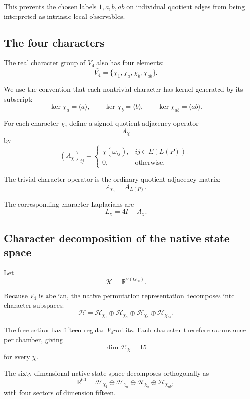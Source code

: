 This prevents the chosen labels \(1,a,b,ab\) on individual quotient
edges from being interpreted as intrinsic local observables.

\subsection{The four characters}

The real character group of \(V_4\) also has four elements:
\[
\widehat{V_4}
=
\{\chi_1,\chi_a,\chi_b,\chi_{ab}\}.
\]

We use the convention that each nontrivial character has kernel
generated by its subscript:
\[
\ker\chi_a=\langle a\rangle,
\qquad
\ker\chi_b=\langle b\rangle,
\qquad
\ker\chi_{ab}=\langle ab\rangle.
\]

For each character \(\chi\), define a signed quotient adjacency
operator
\[
A_\chi
\]
by
\[
(A_\chi)_{ij}
=
\begin{cases}
\chi(\omega_{ij}), & ij\in E(L(P)),\\
0, & \text{otherwise}.
\end{cases}
\]

The trivial-character operator is the ordinary quotient adjacency
matrix:
\[
A_{\chi_1}=A_{L(P)}.
\]

The corresponding character Laplacians are
\[
L_\chi=4I-A_\chi.
\]

\subsection{Character decomposition of the native state space}

Let
\[
\mathcal H=\mathbb R^{V(G_{60})}.
\]

Because \(V_4\) is abelian, the native permutation representation
decomposes into character subspaces:
\[
\mathcal H
=
\mathcal H_{\chi_1}
\oplus
\mathcal H_{\chi_a}
\oplus
\mathcal H_{\chi_b}
\oplus
\mathcal H_{\chi_{ab}}.
\]

The free action has fifteen regular \(V_4\)-orbits. Each character
therefore occurs once per chamber, giving
\[
\dim\mathcal H_\chi=15
\]
for every \(\chi\).

\begin{theorem}
The sixty-dimensional native state space decomposes orthogonally as
\[
\mathbb R^{60}
=
\mathcal H_{\chi_1}
\oplus
\mathcal H_{\chi_a}
\oplus
\mathcal H_{\chi_b}
\oplus
\mathcal H_{\chi_{ab}},
\]
with four sectors of dimension fifteen.
\end{theorem}

